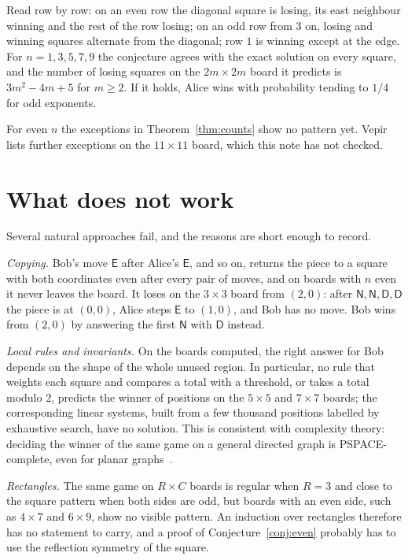 \documentclass[11pt]{article}
\theoremstyle{remark}
\newcommand{\E}{\mathsf{E}}
\newcommand{\N}{\mathsf{N}}
\newcommand{\D}{\mathsf{D}}
\begin{document}
Read row by row: on an even row the diagonal square is losing, its east neighbour winning and the
rest of the row losing; on an odd row from $3$ on, losing and winning squares alternate from the
diagonal; row $1$ is winning except at the edge. For $n=1,3,5,7,9$ the conjecture agrees with the
exact solution on every square, and the number of losing squares on the $2m\times 2m$ board it
predicts is $3m^2-4m+5$ for $m\ge 2$. If it holds, Alice wins with probability tending to $1/4$
for odd exponents.

For even $n$ the exceptions in Theorem~\ref{thm:counts} show no pattern yet. Vepir lists
further exceptions on the $11\times 11$ board, which this note has not checked.

\section{What does not work}

Several natural approaches fail, and the reasons are short enough to record.

\emph{Copying.} Bob's move $\E$ after Alice's $\E$, and so on, returns the piece to a square with
both coordinates even after every pair of moves, and on boards with $n$ even it never leaves the
board. It loses on the $3\times3$ board from $(2,0)$: after $\N,\N,\D,\D$ the piece is at
$(0,0)$, Alice steps $\E$ to $(1,0)$, and Bob has no move. Bob wins from $(2,0)$ by answering
the first $\N$ with $\D$ instead.

\emph{Local rules and invariants.} On the boards computed, the right answer for Bob depends on
the shape of the whole unused region. In particular, no rule that weights each square and
compares a total with a threshold, or takes a total modulo $2$, predicts the winner of
positions on the $5\times5$ and $7\times7$ boards; the corresponding linear systems, built from
a few thousand positions labelled by exhaustive search, have no solution. This is consistent
with complexity theory: deciding the winner of the same game on a general directed graph is
PSPACE-complete, even for planar graphs~\cite{LS}.

\emph{Rectangles.} The same game on $R\times C$ boards is regular when $R=3$ and close to the
square pattern when both sides are odd, but boards with an even side, such as $4\times 7$ and
$6\times 9$, show no visible pattern. An induction over rectangles therefore has no statement to
carry, and a proof of Conjecture~\ref{conj:even} probably has to use the reflection symmetry
of the square.
\end{document}
